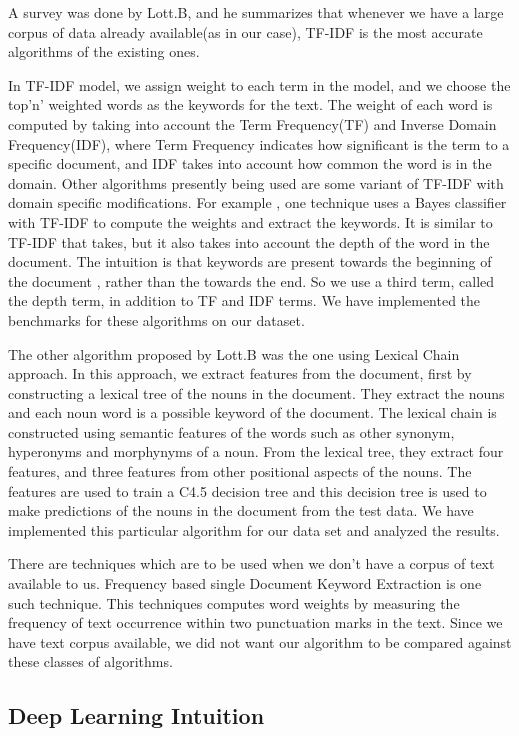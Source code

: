 \documentclass[dvips,9pt]{article}
\begin{document}
		A survey was done by Lott.B\cite{lott2012survey}, and he summarizes that whenever we have a large corpus of data already available(as in our case), TF-IDF is the most accurate algorithms of the existing ones. 
		
		In TF-IDF model, we assign weight to each term in the model, and we choose the top'n' weighted words as the keywords for the text. The weight of each word is computed by taking into account the Term Frequency(TF) and Inverse Domain Frequency(IDF), where Term Frequency indicates how significant is the term to a specific document, and IDF takes into account how common the word is in the domain. 	Other algorithms presently being used are some variant of TF-IDF with domain specific modifications. For example , one technique uses a Bayes classifier with TF-IDF to compute the weights and extract the keywords. It is similar to TF-IDF that takes, but it also takes into account the depth of the word in the document. The intuition is that keywords are present towards the beginning of the document , rather than the towards the end. So we use a third term, called the depth term, in addition to TF and IDF terms. We have implemented the benchmarks for these algorithms on our dataset.
		
		The other algorithm proposed by Lott.B\cite{lott2012survey} was the one using Lexical Chain approach. In this approach, we extract features from the document, first by constructing a lexical tree of the nouns in the document. They extract the nouns and each noun word is a possible keyword of the document. The lexical chain is constructed using semantic features of the words such as other synonym, hyperonyms and morphynyms of a noun. From the lexical tree, they extract four features, and three features from other positional aspects of the nouns. The features are used to train a C4.5 decision tree and this decision tree is used to make predictions of the nouns in the document from the test data. We have implemented this particular algorithm for our data set and analyzed the results.
		

		There are techniques which are to be used when we don't have a corpus of text available to us. Frequency based single Document Keyword Extraction is one such technique. This techniques computes word weights by measuring the frequency of text occurrence within two punctuation marks in the text. Since we have text corpus available, we did not want our algorithm to be compared against these classes of algorithms.
		\subsection{Deep Learning Intuition}
\end{document}
